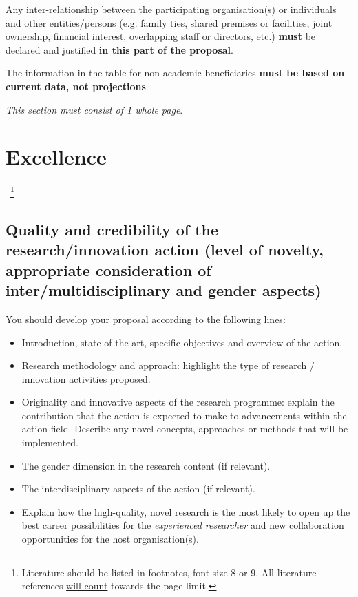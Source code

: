 \noindent
Any inter-relationship between the participating organisation(s) or individuals and other entities/persons (e.g. family ties, shared premises or facilities, joint ownership, financial interest, overlapping staff or directors, etc.) \textbf{must} be declared and justified \textbf{in this part of the proposal}.

The information in the table for non-academic beneficiaries \textbf{must be based on current data, not projections}.

\textit{This section must consist of 1 whole page}.

\newpage
\markStartPageLimit
\section{Excellence}
\label{sec:excellence}
~\footnote{Literature should be listed in footnotes, font size 8 or 9. All literature references \ul{will count} towards the page limit.}

\subsection{Quality and credibility of the research/innovation action (level of novelty, appropriate consideration of inter/multidisciplinary and gender aspects)}
\label{sec:excellence_quality}

You should develop your proposal according to the following lines:
\begin{itemize}
	\item Introduction, state-of-the-art, specific objectives and overview of the action.
	\item Research methodology and approach: highlight the type of research / innovation activities proposed.
	\item Originality and innovative aspects of the research programme: explain the contribution that the action is expected to make to advancements within the action field. Describe any novel concepts, approaches or methods that will be implemented.
	\item The gender dimension in the research content (if relevant).
	
	\item The interdisciplinary aspects of the action (if relevant).
	\item Explain how the high-quality, novel research is the most likely to open up the best career possibilities for the \textit{experienced researcher} and new collaboration opportunities for the host organisation(s). 
\end{itemize}




